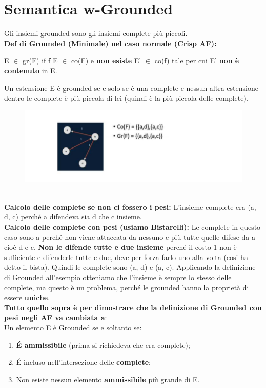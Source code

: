     \section{Semantica w-Grounded}
    Gli insiemi grounded sono gli insiemi complete più piccoli. \\\textbf{Def di
        Grounded (Minimale) nel caso normale (Crisp AF):}
    \begin{center}
        E $\in$ gr(F) if f E $\in$ co(F) e \textbf{non esiste} E' $\in$ co(f)
        tale per cui E' \textbf{non è contenuto} in E.
    \end{center}
    Un estensione E è grounded se e solo se è una complete e nessun altra
    estensione dentro le complete è più piccola di lei (quindi è la più piccola
    delle complete).
    \begin{figure}[htp]
        \centering
        \includegraphics[width=12cm, keepaspectratio]{img/Cap6/w-grounded.png}
    \end{figure}
    \\\textbf{Calcolo delle complete se non ci fossero i pesi:} L'insieme
    complete era (a, d, c) perché a difendeva sia d che c insieme.
    \\\textbf{Calcolo delle complete con pesi (usiamo Bistarelli):} Le complete
    in questo caso sono a perché non viene attaccata da nessuno e più tutte
    quelle difese da a cioè d e c. \textbf{Non le difende tutte e due insieme}
    perché il costo 1 non è sufficiente e difenderle tutte e due, deve per forza
    farlo uno alla volta (cosi ha detto il bista). Quindi le complete sono (a,
    d) e (a, c). Applicando la definizione di Grounded all'esempio otteniamo che
    l'insieme è sempre lo stesso delle complete, ma questo è un problema, perché
    le grounded hanno la proprietà di essere \textbf{uniche}. \\\textbf{Tutto
        quello sopra è per dimostrare che la definizione di Grounded con pesi negli
        AF va cambiata a}:\\
    Un elemento E è Grounded se e soltanto se:
    \begin{enumerate}
        \item \textbf{ É ammissibile} (prima si richiedeva che era complete);
        \item  É incluso nell'intersezione delle \textbf{complete};
        \item  Non esiste nessun elemento \textbf{ammissibile} più grande di E.
    \end{enumerate}
